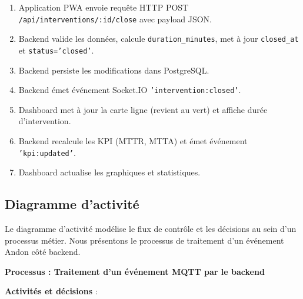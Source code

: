 \begin{enumerate}
    \item Application PWA envoie requête HTTP POST \texttt{/api/interventions/:id/close} avec payload JSON.
    \item Backend valide les données, calcule \texttt{duration\_minutes}, met à jour \texttt{closed\_at} et \texttt{status='closed'}.
    \item Backend persiste les modifications dans PostgreSQL.
    \item Backend émet événement Socket.IO \texttt{'intervention:closed'}.
    \item Dashboard met à jour la carte ligne (revient au vert) et affiche durée d'intervention.
    \item Backend recalcule les KPI (MTTR, MTTA) et émet événement \texttt{'kpi:updated'}.
    \item Dashboard actualise les graphiques et statistiques.
\end{enumerate}



\subsection{Diagramme d'activité}

Le diagramme d'activité modélise le flux de contrôle et les décisions au sein d'un processus métier. Nous présentons le processus de traitement d'un événement Andon côté backend.

\textbf{Processus : Traitement d'un événement MQTT par le backend}

\textbf{Activités et décisions} :

